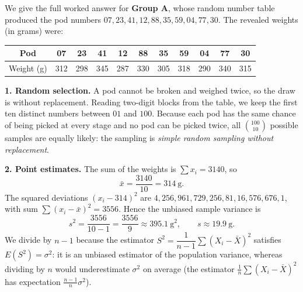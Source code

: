 \documentclass[11pt]{article}
\newcommand{\cle}[1]{{\popxbold\color{popdark}#1}}
\newcounter{popsec}
\newcounter{popsub}
\newcommand{\courssub}[1]{%
  \stepcounter{popsub}%
  \par\vspace{9pt}\noindent{\popxbold\fontsize{11.5}{13}\selectfont\color{popink}{\color{poporange}\thepopsec.\thepopsub}\hspace{6pt}#1}\par\nopagebreak\vspace{4pt}
}
\begin{document}
\courssub{Model answer}

We give the full worked answer for \textbf{Group A}, whose random number table produced the pod numbers $07, 23, 41, 12, 88, 35, 59, 04, 77, 30$. The revealed weights (in grams) were:

\begin{center}
\begin{tabular}{|c|cccccccccc|}
\hline
\rowcolor{popblueL} Pod & 07 & 23 & 41 & 12 & 88 & 35 & 59 & 04 & 77 & 30 \\
\hline
Weight (g) & 312 & 298 & 345 & 287 & 330 & 305 & 318 & 290 & 340 & 315 \\
\hline
\end{tabular}
\end{center}

\textbf{1. Random selection.} A pod cannot be broken and weighed twice, so the draw is \cle{without replacement}. Reading two-digit blocks from the table, we keep the first ten distinct numbers between $01$ and $100$. Because each pod has the same chance of being picked at every stage and no pod can be picked twice, all $\binom{100}{10}$ possible samples are equally likely: the sampling is \emph{simple random sampling without replacement}.

\textbf{2. Point estimates.} The sum of the weights is $\sum x_i = 3140$, so
\[ \bar{x} = \frac{3140}{10} = 314\ \text{g}. \]
The squared deviations $(x_i - 314)^2$ are $4, 256, 961, 729, 256, 81, 16, 576, 676, 1$, with sum $\sum (x_i - \bar{x})^2 = 3556$. Hence the unbiased sample variance is
\[ s^2 = \frac{3556}{10 - 1} = \frac{3556}{9} \approx 395.1\ \mathrm{g}^2, \qquad s \approx 19.9\ \text{g}. \]
We divide by $n-1$ because the estimator $S^2 = \dfrac{1}{n-1}\sum (X_i - \bar{X})^2$ satisfies $E(S^2) = \sigma^2$: it is an \cle{unbiased estimator} of the population variance, whereas dividing by $n$ would underestimate $\sigma^2$ on average (the estimator $\frac{1}{n}\sum (X_i - \bar{X})^2$ has expectation $\frac{n-1}{n}\sigma^2$).
\end{document}
